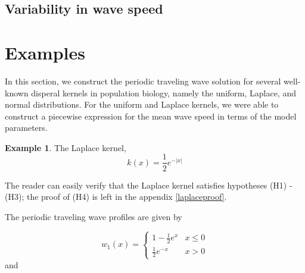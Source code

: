 \documentclass[11pt]{article}
\theoremstyle{definition}
\newtheorem{ex}[thm]{Example}
\numberwithin{equation}{section}
\numberwithin{thm}{section}
\renewcommand{\a}{a}
\renewcommand{\b}{b}
\newcommand{\m}{n_1}
\begin{document}
\subsection{Variability in wave speed}

\section{Examples}

In this section, we construct the periodic traveling wave solution for several well-known disperal kernels in population biology, namely the uniform, Laplace, and normal distributions. For the uniform and Laplace kernels, we were able to construct a piecewise expression for the mean wave speed in terms of the model parameters. 

\begin{ex}
The Laplace kernel,
\begin{equation}\label{laplacekernel}
k(x) = \frac{1}{2} e^{-|x|}
\end{equation}

The reader can easily verify that the Laplace kernel satisfies hypotheses (H1) - (H3); the proof of (H4) is left in the appendix \ref{laplaceproof}.

The periodic traveling wave profiles are given by

\begin{equation} \label{w1laplace}
w_1(x) =   \begin{cases} 
1 - \frac{1}{2}e^{x} & x \leq 0 \\
\frac{1}{2}e^{-x} & x > 0
\end{cases}
\end{equation}
and


\end{ex}
\end{document}
